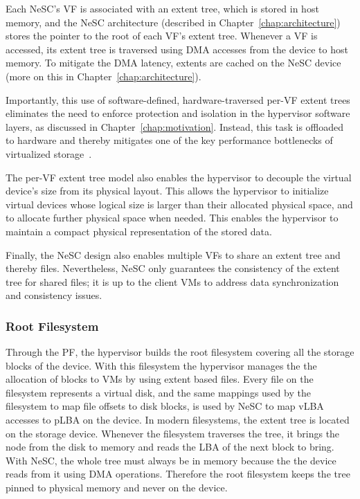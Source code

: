 Each  NeSC's VF is associated with an extent tree, which is stored in host memory, and the NeSC architecture (described in Chapter~\ref{chap:architecture}) stores the pointer to the root of each VF's extent tree. Whenever a VF is accessed, its extent tree is traversed using DMA accesses from the device to host memory. To mitigate the DMA latency, extents are cached on the NeSC device (more on this in Chapter~\ref{chap:architecture}).

Importantly, this use of software-defined, hardware-traversed per-VF extent trees eliminates the need to enforce protection and isolation in the hypervisor software layers, as discussed in Chapter~\ref{chap:motivation}. Instead, this task is offloaded to hardware and thereby mitigates one of the key performance bottlenecks of virtualized storage~\cite{le12nested}.

The per-VF extent tree model also enables the hypervisor to decouple the virtual device's size from its physical layout. This allows the hypervisor to initialize virtual devices whose logical size is larger than their allocated physical space, and to allocate further physical space when needed. This enables the hypervisor to maintain a compact physical representation of the stored data.

Finally, the NeSC design also enables multiple VFs to share an extent tree and thereby files. Nevertheless, NeSC only guarantees the consistency of the extent tree for shared files; it is up to the client VMs to address data synchronization and consistency issues.

\subsubsection{Root Filesystem}
\label{des:rootfs}
Through the PF, the hypervisor builds the root filesystem covering all the storage blocks of the device. With this filesystem the hypervisor manages the the allocation of blocks to VMs by using extent based files.
Every file on the filesystem represents a virtual disk, and the same mappings used by the filesystem to map file offsets to disk blocks, is used by NeSC to map vLBA accesses to pLBA on the device.
In modern filesystems, the extent tree is located on the storage device. Whenever the filesystem traverses the tree, it brings the node from the disk to memory and reads the LBA of the next block to bring. With NeSC,
the whole tree must always be in memory because the the device reads from it using DMA operations. Therefore the root filesystem keeps the tree pinned to physical memory and never on the device. 



